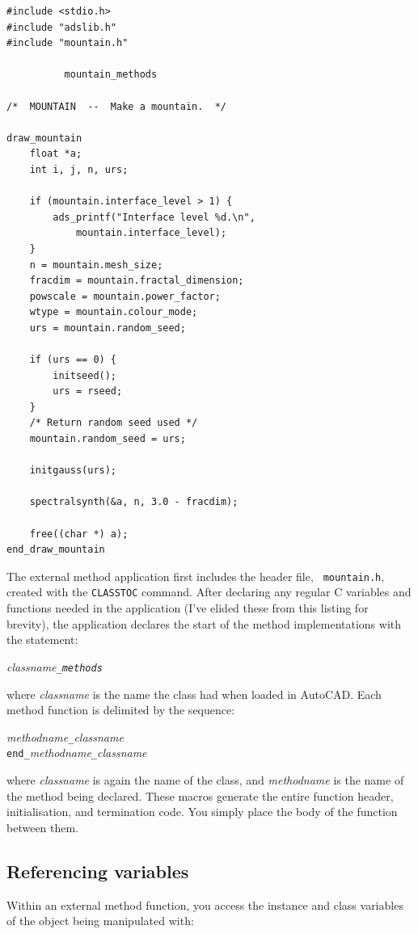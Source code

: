 \documentclass{article}
\begin{document}
{\small
\begin{verbatim}
#include <stdio.h>
#include "adslib.h"
#include "mountain.h"

          mountain_methods

/*  MOUNTAIN  --  Make a mountain.  */

draw_mountain
    float *a;
    int i, j, n, urs;

    if (mountain.interface_level > 1) {
        ads_printf("Interface level %d.\n",
            mountain.interface_level);
    }
    n = mountain.mesh_size;
    fracdim = mountain.fractal_dimension;
    powscale = mountain.power_factor;
    wtype = mountain.colour_mode;
    urs = mountain.random_seed;

    if (urs == 0) {
        initseed();
        urs = rseed;
    }
    /* Return random seed used */
    mountain.random_seed = urs;

    initgauss(urs);

    spectralsynth(&a, n, 3.0 - fracdim);

    free((char *) a);
end_draw_mountain
\end{verbatim}
}

The external method application first includes the header file, {\tt
mountain.h}, created with the {\tt CLASSTOC} command.  After declaring
any regular C variables and functions needed in the application (I've
elided these from this listing for brevity), the application declares
the start of the method implementations with the statement:

{\em classname\verb+_methods+}

where {\em classname} is the name the class had when loaded in
AutoCAD\@.  Each method function is delimited by the sequence:

{\em methodname\verb+_+classname}\\
{\verb+end_+\em methodname\verb+_+classname}

where {\em classname} is again the name of the class, and {\em
methodname} is the name of the method being declared.  These macros
generate the entire function header, initialisation, and termination
code.  You simply place the body of the function between them.

\subsection{Referencing variables}

Within an external method function, you access the instance
and class variables of the object being manipulated with:
\end{document}
